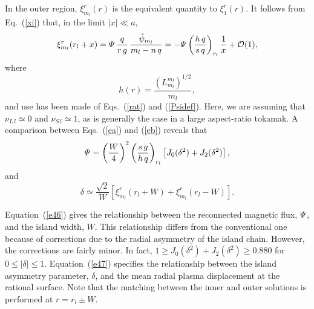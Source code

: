 \documentclass{iopjournal}
\begin{document}
{In the outer region,  $\xi_{m_{l}}^r(r)$ is the equivalent quantity to $\xi_1^r(r)$.  It follows from Eq.~(\ref{xi}) that, in the limit $|x|\ll a$, 
\begin{equation}\label{eb}
\xi_{m_{l}}^r(r_{l}+x)={\mit\Psi}\,\frac{q}{r\,g}\,\frac{\hat{\psi}_{m_{l}}}{m_{l}-n\,q}
= -{\mit\Psi}\left(\frac{h\,q}{s\,q}\right)_{r_l}\frac{1}{x} + {\cal O}(1),
\end{equation}
where 
\begin{equation}
h(r) = \frac{(L_{m_{l}}^{m_{l}})^{1/2}}{m_{l}},
\end{equation}
and use has been made of Eqs.~(\ref{rat}) and (\ref{Psidef}). Here, we are assuming that $\nu_{L\,l}\simeq 0$ and $\nu_{S\,l}\simeq 1$,
as is generally the case in a large aspect-ratio tokamak. 
A comparison between Eqs.~(\ref{ea}) and (\ref{eb}) reveals that
\begin{equation}\label{e46}
{\mit\Psi} = \left(\frac{W}{4}\right)^2\left(\frac{s\,g}{h\,q}\right)_{r_{l}}\left[J_0(\delta^2)+ J_2(\delta^2)\right],
\end{equation}
and
\begin{equation}\label{e47}
\delta \simeq \frac{\sqrt{2}}{W}\left[\xi_{m_{l}}^r(r_{l}+W)+\xi_{m_{l}}^r(r_{l}-W)\right].
\end{equation}

Equation~(\ref{e46}) gives the relationship between the reconnected magnetic flux, ${\mit\Psi}$, and the island width, $W$. This relationship
differs from the conventional one \cite{ntm1} because of corrections due to the radial asymmetry of the island chain. However, the corrections are fairly
minor. In fact, $1\geq J_0(\delta^2)+ J_2(\delta^2)\geq 0.880$ for $0\leq |\delta|\leq 1$. Equation~(\ref{e47}) specifies the relationship between the
island asymmetry parameter, $\delta$,  and the mean radial plasma displacement at the rational surface. Note that the matching
between the inner and outer solutions is performed at $r=r_{l}\pm W$. 

}
\end{document}
